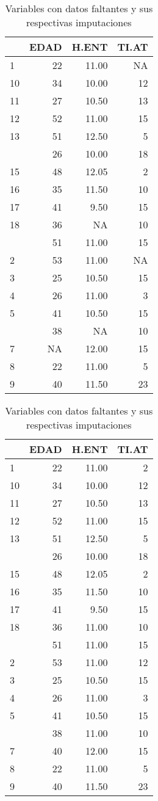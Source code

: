 \documentclass[]{book}
\begin{document}
\begin{table}
\caption{\label{tab:faltantes-imputados}Variables con datos faltantes y sus respectivas imputaciones}

\centering
\begin{tabular}[t]{lrrr}
\toprule
  & EDAD & H.ENT & TI.AT\\
\midrule
1 & 22 & 11.00 & NA\\
10 & 34 & 10.00 & 12\\
11 & 27 & 10.50 & 13\\
12 & 52 & 11.00 & 15\\
13 & 51 & 12.50 & 5\\
\addlinespace
14 & 26 & 10.00 & 18\\
15 & 48 & 12.05 & 2\\
16 & 35 & 11.50 & 10\\
17 & 41 & 9.50 & 15\\
18 & 36 & NA & 10\\
\addlinespace
19 & 51 & 11.00 & 15\\
2 & 53 & 11.00 & NA\\
3 & 25 & 10.50 & 15\\
4 & 26 & 11.00 & 3\\
5 & 41 & 10.50 & 15\\
\addlinespace
6 & 38 & NA & 10\\
7 & NA & 12.00 & 15\\
8 & 22 & 11.00 & 5\\
9 & 40 & 11.50 & 23\\
\bottomrule
\end{tabular}
\centering
\begin{tabular}[t]{lrrr}
\toprule
  & EDAD & H.ENT & TI.AT\\
\midrule
1 & 22 & 11.00 & 2\\
10 & 34 & 10.00 & 12\\
11 & 27 & 10.50 & 13\\
12 & 52 & 11.00 & 15\\
13 & 51 & 12.50 & 5\\
\addlinespace
14 & 26 & 10.00 & 18\\
15 & 48 & 12.05 & 2\\
16 & 35 & 11.50 & 10\\
17 & 41 & 9.50 & 15\\
18 & 36 & 11.00 & 10\\
\addlinespace
19 & 51 & 11.00 & 15\\
2 & 53 & 11.00 & 12\\
3 & 25 & 10.50 & 15\\
4 & 26 & 11.00 & 3\\
5 & 41 & 10.50 & 15\\
\addlinespace
6 & 38 & 11.00 & 10\\
7 & 40 & 12.00 & 15\\
8 & 22 & 11.00 & 5\\
9 & 40 & 11.50 & 23\\
\bottomrule
\end{tabular}
\end{table}
\end{document}
